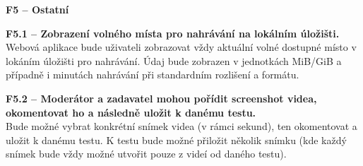 \documentclass[thesis=M,czech]{FITthesis}[2012/06/26]
\begin{document}
\begin{description}
  \item \textbf{F5 -- Ostatní}
  \begin{description}
    \item \textbf{F5.1 -- Zobrazení volného místa pro nahrávání na lokálním úložišti.\\}
    Webová aplikace bude uživateli zobrazovat vždy aktuální volné dostupné místo v lokáním úložišti pro nahrávání. Údaj bude zobrazen v jednotkách MiB/GiB a případně i minutách nahrávání při standardním rozlišení a formátu.
    \item \textbf{F5.2 -- Moderátor a zadavatel mohou pořídit screenshot videa, okomentovat ho a následně uložit k danému testu.\\}
	Bude možné vybrat konkrétní snímek videa (v rámci sekund), ten okomentovat a uložit k danému testu. K testu bude možné přiložit několik snímku (kde každý snímek bude vždy možné utvořit pouze z videí od daného testu).
  \end{description}
\end{description}
\end{document}
